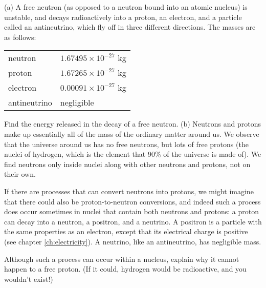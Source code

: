 (a) A free neutron (as opposed to a neutron bound into
an atomic nucleus) is unstable, and decays radioactively
into a proton, an electron, and a particle called an
antineutrino, which fly off in three different directions.
 The masses are as follows:

\qquad\begin{tabular}{ll}
        neutron                & $1.67495\times10^{-27}$  kg\\
        proton                & $1.67265\times10^{-27}$  kg\\
        electron        & $0.00091\times10^{-27}$  kg\\
        antineutrino        & negligible\\
\end{tabular}

\noindent Find the energy released in the decay of a free neutron.\answercheck\hwendpart
(b) Neutrons and protons make up essentially all of the mass of the ordinary
matter around us. We observe that the universe around us has no free neutrons, but
lots of free protons
(the nuclei of hydrogen, which is the element that 90\% of the universe
is made of). We find neutrons only inside nuclei along with other neutrons and
protons, not on their own.

If there are processes that can convert neutrons into protons, we might imagine
that there could also be proton-to-neutron conversions, and indeed such a process
does occur sometimes in nuclei that contain both neutrons and protons:
a proton can decay into a
neutron, a positron, and a neutrino. A positron is a particle with the same
properties as an electron, except that its electrical charge is positive
(see chapter \ref{ch:electricity}). A neutrino, like an antineutrino, has negligible mass.

Although such a process
can occur within a nucleus, explain why it cannot happen to
a free proton. (If it could, hydrogen would be radioactive, and you
wouldn't exist!)
